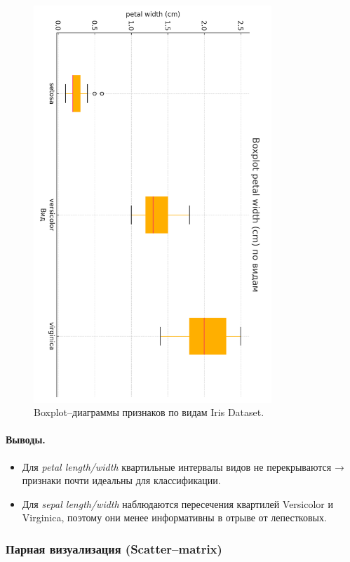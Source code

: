 \begin{figure}[H]
  \includegraphics[width=0.8\textwidth]{images/box_petal_width_cm_cb2.png}
  \caption{Boxplot–диаграммы признаков по видам Iris Dataset.}
\end{figure}

\paragraph{Выводы.}
\begin{itemize}
  \item Для \emph{petal length/width} квартильные интервалы видов не перекрываются → признаки почти идеальны для классификации.
  \item Для \emph{sepal length/width} наблюдаются пересечения квартилей Versicolor и Virginica, поэтому они менее информативны в отрыве от лепестковых.
\end{itemize}

\subsubsection{Парная визуализация (Scatter–matrix)}

